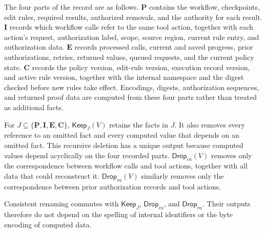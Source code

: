 The four parts of the record are as follows.
\(\mathbf P\) contains the workflow, checkpoints, edit rules, required results, authorized removals, and the authority for each result.
\(\mathbf I\) records which workflow calls refer to the same tool action, together with each action's request, authorization label, scope, source region, current rule entry, and authorization data.
\(\mathbf E\) records processed calls, current and saved progress, prior authorizations, retries, returned values, queued requests, and the current policy state.
\(\mathbf C\) records the policy version, edit-rule version, execution record version, and active rule version, together with the internal namespace and the digest checked before new rules take effect.
Encodings, digests, authorization sequences, and returned proof data are computed from these four parts rather than treated as additional facts.

For \(J\subseteq\{\mathbf P,\mathbf I,\mathbf E,\mathbf C\}\), \(\mathsf{Keep}_J(V)\) retains the facts in \(J\).
It also removes every reference to an omitted fact and every computed value that depends on an omitted fact.
This recursive deletion has a unique output because computed values depend acyclically on the four recorded parts.
\(\mathsf{Drop}_{ca}(V)\) removes only the correspondence between workflow calls and tool actions, together with all data that could reconstruct it.
\(\mathsf{Drop}_{ra}(V)\) similarly removes only the correspondence between prior authorization records and tool actions.

\begin{lemma}
\label{lem:app-omission}
Consistent renaming commutes with \(\mathsf{Keep}_J\), \(\mathsf{Drop}_{ca}\), and \(\mathsf{Drop}_{ra}\).
Their outputs therefore do not depend on the spelling of internal identifiers or the byte encoding of computed data.
\end{lemma}

